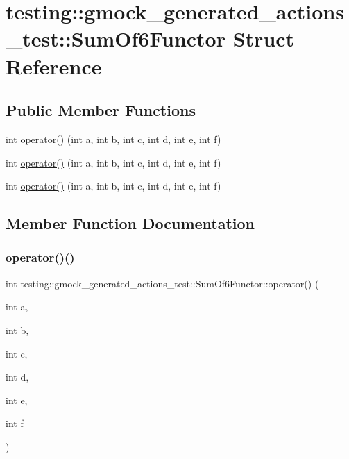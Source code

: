 \hypertarget{structtesting_1_1gmock__generated__actions__test_1_1_sum_of6_functor}{}\section{testing\+::gmock\+\_\+generated\+\_\+actions\+\_\+test\+::Sum\+Of6\+Functor Struct Reference}
\label{structtesting_1_1gmock__generated__actions__test_1_1_sum_of6_functor}
\subsection*{Public Member Functions}
\begin{DoxyCompactItemize}
\item 
int \mbox{\hyperlink{structtesting_1_1gmock__generated__actions__test_1_1_sum_of6_functor_adb500f7bdfa5a5887623fa38cd805e41}{operator()}} (int a, int b, int c, int d, int e, int f)
\item 
int \mbox{\hyperlink{structtesting_1_1gmock__generated__actions__test_1_1_sum_of6_functor_adb500f7bdfa5a5887623fa38cd805e41}{operator()}} (int a, int b, int c, int d, int e, int f)
\item 
int \mbox{\hyperlink{structtesting_1_1gmock__generated__actions__test_1_1_sum_of6_functor_adb500f7bdfa5a5887623fa38cd805e41}{operator()}} (int a, int b, int c, int d, int e, int f)
\end{DoxyCompactItemize}


\subsection{Member Function Documentation}
\mbox{\label{structtesting_1_1gmock__generated__actions__test_1_1_sum_of6_functor_adb500f7bdfa5a5887623fa38cd805e41}} 
\subsubsection{\texorpdfstring{operator()()}{operator()()}\hspace{0.1cm}{\footnotesize\ttfamily [1/3]}}
{\footnotesize\ttfamily int testing\+::gmock\+\_\+generated\+\_\+actions\+\_\+test\+::\+Sum\+Of6\+Functor\+::operator() (\begin{DoxyParamCaption}\item[{int}]{a,  }\item[{int}]{b,  }\item[{int}]{c,  }\item[{int}]{d,  }\item[{int}]{e,  }\item[{int}]{f }\end{DoxyParamCaption})\hspace{0.3cm}{\ttfamily [inline]}}

